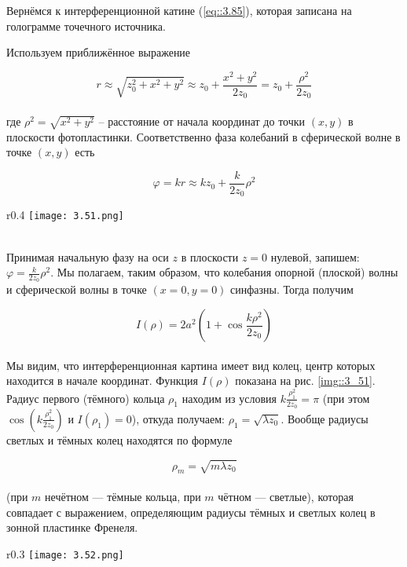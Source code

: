 Вернёмся к интерференционной катине (\ref{eq::3.85}), которая записана на голограмме точечного
источника. 

Используем приближённое выражение

\begin{equation}
r \approx \sqrt{z_0^2 + x^2 + y^2} \approx z_0 + \frac{x^2 + y^2}{2 z_0} = z_0 + \frac{\rho^2}{2 z_0}
\end{equation}
\\
где $\rho^2 = \sqrt{x^2 + y^2}$ -- расстояние от начала координат до точки $(x, y)$ в плоскости
фотопластинки. Соответственно фаза колебаний в сферической волне в точке $(x, y)$ есть

$$
\varphi = k r \approx k z_0 + \frac{k}{2 z_0} \rho^2
$$
\begin{wrapfigure}{r}{0.4\linewidth}
    \texttt{[image: 3.51.png]}
    \caption{Зависимость $I(\rho)$}
    \label{img::3_51}
\end{wrapfigure}
\\
Принимая начальную фазу на оси $z$ в плоскости $z = 0$ нулевой, запишем:
$\varphi = \frac{k}{2 z_0} \rho^2$. Мы полагаем, таким образом, что колебания опорной (плоской)
волны и сферической волны в точке $(x = 0,y = 0)$ синфазны. Тогда получим

\begin{equation}
    I(\rho) = 2 a^2 \left( 1 + \cos \frac{k \rho^2}{2 z_0} \right)
\end{equation}
\\
Мы видим, что интерференционная картина имеет вид колец, центр которых находится в начале координат. 
Функция $I(\rho)$ показана на рис. \ref{img::3_51}. Радиус первого (тёмного) кольца $\rho_1$
находим из условия $k \frac{\rho_1^2}{2 z_0} = \pi$ (при этом 
$\cos \left( k \frac{\rho_1^2}{2 z_0} \right)$ и $I(\rho_1) = 0$), откуда получаем: 
$\rho_1 = \sqrt{\lambda z_0}$. Вообще радиусы светлых и тёмных колец находятся по формуле

\begin{equation}
    \rho_m  = \sqrt{m \lambda z_0}
\end{equation}
\\
(при $m$ нечётном — тёмные кольца, при $m$ чётном — светлые), которая совпадает с выражением, 
определяющим радиусы тёмных и светлых колец в зонной пластинке Френеля.

\begin{wrapfigure}{r}{0.3\linewidth}
    \texttt{[image: 3.52.png]}
    \caption{Зависимость $I(\rho)$}
    \label{img::3_52}
\end{wrapfigure}

